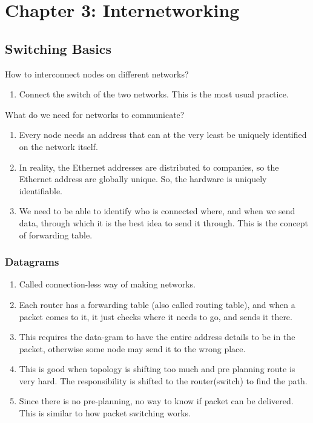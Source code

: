 \documentclass[12pt]{book}
\begin{document}
\chapter{Chapter 3: Internetworking}

\section{Switching Basics}
How to interconnect nodes on different networks?
\begin{enumerate}
    \item Connect the switch of the two networks. This is the most usual practice.
\end{enumerate}
What do we need for networks to communicate?
\begin{enumerate}
    \item Every node needs an address that can at the very least be uniquely identified on the network itself.
    \item In reality, the Ethernet addresses are distributed to companies, so the Ethernet address are globally unique. So, the hardware is uniquely identifiable.
    \item We need to be able to identify who is connected where, and when we send data, through which it is the best idea to send it through. This is the concept of forwarding table.
\end{enumerate}

\subsection{Datagrams}
\begin{enumerate}
    \item Called connection-less way of making networks. 
    \item Each router has a forwarding table (also called routing table), and when a packet comes to it, it just checks where it needs to go, and sends it there. 
    \item This requires the data-gram to have the entire address details to be in the packet, otherwise some node may send it to the wrong place. 
    \item This is good when topology is shifting too much and pre planning route is very hard. The responsibility is shifted to the router(switch) to find the path. 
    \item Since there is no pre-planning, no way to know if packet can be delivered. This is similar to how packet switching works.
\end{enumerate}
\end{document}
